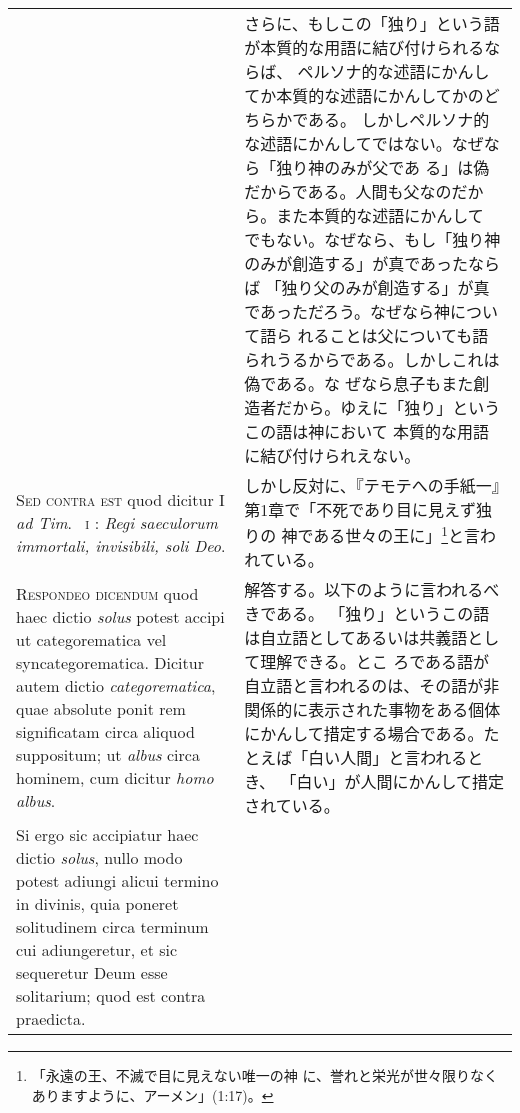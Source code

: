 \documentclass[10pt]{jsarticle} %
\begin{document}
\begin{longtable}{p{21em}p{21em}}
&


さらに、もしこの「独り」という語が本質的な用語に結び付けられるならば、
 ペルソナ的な述語にかんしてか本質的な述語にかんしてかのどちらかである。
 しかしペルソナ的な述語にかんしてではない。なぜなら「独り神のみが父であ
 る」は偽だからである。人間も父なのだから。また本質的な述語にかんして
 でもない。なぜなら、もし「独り神のみが創造する」が真であったならば
 「独り父のみが創造する」が真であっただろう。なぜなら神について語ら
 れることは父についても語られうるからである。しかしこれは偽である。な
 ぜなら息子もまた創造者だから。ゆえに「独り」というこの語は神において
 本質的な用語に結び付けられえない。



\\




{\scshape Sed contra est} quod dicitur I {\itshape ad Tim}.~{\scshape
 i} : {\itshape Regi saeculorum immortali,
 invisibili, soli Deo}.

&

しかし反対に、『テモテへの手紙一』第1章で「不死であり目に見えず独りの
 神である世々の王に」\footnote{「永遠の王、不滅で目に見えない唯一の神
 に、誉れと栄光が世々限りなくありますように、アーメン」(1:17)。}と言わ
 れている。

\\




{\scshape Respondeo dicendum} quod haec dictio {\itshape solus} potest accipi ut
 categorematica vel syncategorematica. Dicitur autem dictio
 {\itshape categorematica}, quae absolute ponit rem significatam circa aliquod
 suppositum; ut {\itshape albus} circa hominem, cum dicitur {\itshape homo albus}. 


&

解答する。以下のように言われるべきである。
「独り」というこの語は自立語としてあるいは共義語として理解できる。とこ
 ろである語が自立語と言われるのは、その語が非関係的に表示された事物をある個体
 にかんして措定する場合である。たとえば「白い人間」と言われるとき、
 「白い」が人間にかんして措定されている。

\\


Si ergo
 sic accipiatur haec dictio {\itshape solus}, nullo modo potest adiungi alicui
 termino in divinis, quia poneret solitudinem circa terminum cui
 adiungeretur, et sic sequeretur Deum esse solitarium; quod est contra
 praedicta. 

&


\end{longtable}
\end{document}
